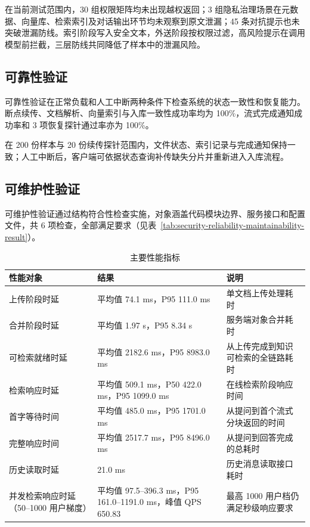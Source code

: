 在当前测试范围内，30 组权限矩阵均未出现越权返回；3 组隐私治理场景在元数据、向量库、检索索引及对话输出环节均未观察到原文泄漏；45 条对抗提示也未突破泄漏防线。索引阶段写入安全文本，外送阶段按权限过滤，高风险提示在调用模型前拦截，三层防线共同降低了样本中的泄漏风险。

\subsection{可靠性验证}

可靠性验证在正常负载和人工中断两种条件下检查系统的状态一致性和恢复能力。断点续传、文档解析、向量索引与入库一致性成功率均为 100\%，流式完成通知成功率和 3 项恢复探针通过率亦为 100\%。

在 200 份样本与 20 份续传探针范围内，文件状态、索引记录与完成通知保持一致；人工中断后，客户端可依据状态查询补传缺失分片并重新进入入库流程。

\subsection{可维护性验证}

可维护性验证通过结构符合性检查实施，对象涵盖代码模块边界、服务接口和配置文件，共 6 项检查，全部满足要求（见表~\ref{tab:security-reliability-maintainability-result}）。

\begin{table}[H]
    \centering
    \caption{主要性能指标}
    \label{tab:performance-result}
    {\scriptsize
    \setlength{\tabcolsep}{3.5pt}
    \renewcommand{\arraystretch}{0.92}
    \begin{tabularx}{\textwidth}{L{2.8cm}L{4.6cm}Y}
        \toprule
        性能对象 & 结果 & 说明 \\
        \midrule
        上传阶段时延 & 平均值 74.1 ms，P95 111.0 ms & 单文档上传处理耗时 \\
        合并阶段时延 & 平均值 1.97 s，P95 8.34 s & 服务端对象合并耗时 \\
        可检索就绪时延 & 平均值 2182.6 ms，P95 8983.0 ms & 从上传完成到知识可检索的全链路耗时 \\
        检索响应时延 & 平均值 509.1 ms，P50 422.0 ms，P95 1099.0 ms & 在线检索阶段响应时间 \\
        首字等待时间 & 平均值 485.0 ms，P95 1701.0 ms & 从提问到首个流式分块返回的时间 \\
        完整响应时间 & 平均值 2517.7 ms，P95 8496.0 ms & 从提问到回答完成的总耗时 \\
        历史读取时延 & 21.0 ms & 历史消息读取接口耗时 \\
        并发检索响应时延（50--1000 用户梯度） & 平均值 97.5--396.3 ms，P95 161.0--1191.0 ms，峰值 QPS 650.83 & 最高 1000 用户档仍满足秒级响应要求 \\
        \bottomrule
    \end{tabularx}
    }
\end{table}


